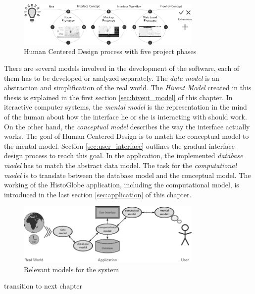 \begin{figure}[H]
  \centering
  \includegraphics[width=0.8\textwidth]{graphics/development/hcd}
  \caption{Human Centered Design process with five project phases}
  \label{fig:hcd}
\end{figure}

There are several models involved in the development of the software, each of them has to be developed or analyzed separately. The \emph{data model} is an abstraction and simplification of the real world. The \emph{Hivent Model} created in this thesis is explained in the first section \ref{sec:hivent_model} of this chapter. In iteractive computer systems, the \emph{mental model} is the representation in the mind of the human about how the interface he or she is interacting with should work. On the other hand, the \emph{conceptual model} describes the way the interface actually works. The goal of Human Centered Design is to match the conceptual model to the mental model. Section \ref{sec:user_interface} outlines the gradual interface design process to reach this goal. In the application, the implemented \emph{database model} has to match the abstract data model. The task for the \emph{computational model} is to translate between the database model and the conceptual model. The working of the HistoGlobe application, including the computational model, is introduced in the last section \ref{sec:application} of this chapter.

\begin{figure}[H]
  \vspace{1em}
  \centering
  \includegraphics[width=0.8\textwidth]{graphics/development/models}
  \caption{Relevant models for the system}
  \label{fig:models}
\end{figure}







\vspace{2em}
transition to next chapter